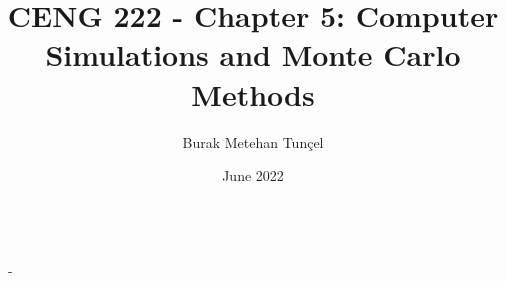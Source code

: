 \documentclass{article}
\title{CENG 222 - Chapter 5: Computer Simulations and Monte Carlo Methods}
\author{Burak Metehan Tunçel}
\date{June 2022}
\makeatletter
\renewcommand\maketitle{
{\raggedright %
\begin{center}
{\Large \bfseries \@title}\\[2ex] 
{\large \@author \ - \@date}\\[2ex]
\end{center}}} %
\makeatother
\begin{document}
\maketitle

\begin{multicols}{2}
\setlength{\columnsep}{1.5cm}
\setlength{\columnseprule}{0.2pt}



\end{multicols}
\end{document}
